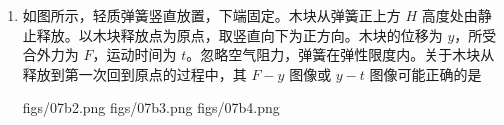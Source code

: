 \documentclass[\gkver]{gaokaozhenti}
\begin{document}
\begin{enumerate}
{B．根据全反射发生的条件 $\sin C = \frac{1}{n}$ 可知红光发生全反射的临界角较大，$\theta$ 逐渐增大时，折射光线与 NP 面的交点左移过程中，在 NP 面的入射角先大于红光发生全反射的临界角，所以红光的全反射现象先消失，故 B 正确；

C．在 MN 面，光是从光疏介质到光密介质，无论 $\theta$ 多大，在 MN 面都不可能发生全反射，故 C 错误；

D．根据折射定律 $n = \frac{\sin\theta}{\sin\alpha}$ 可知 $\theta$ 逐渐减小时，两束光在 MN 面折射的折射角逐渐减小，故 D 错误。

故选 B。
}

\item
如图所示，轻质弹簧竖直放置，下端固定。木块从弹簧正上方 $H$ 高度处由静止释放。以木块释放点为原点，取竖直向下为正方向。木块的位移为 $y$，所受合外力为 $F$，运动时间为 $t$。忽略空气阻力，弹簧在弹性限度内。关于木块从释放到第一次回到原点的过程中，其 $F - y$ 图像或 $y - t$ 图像可能正确的是


{figs/07b2.png}
{figs/07b3.png}
{figs/07b4.png}

\end{enumerate}
\end{document}
